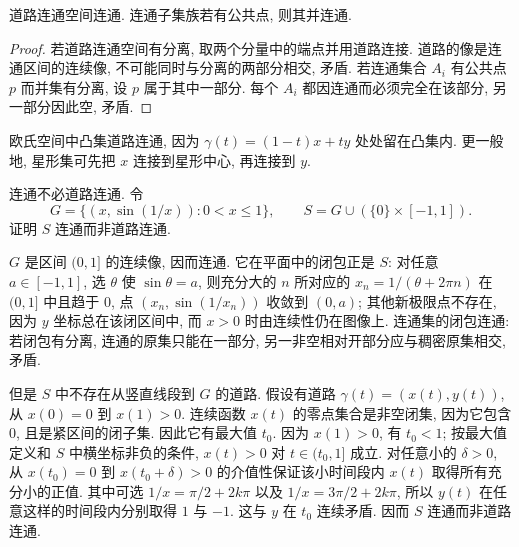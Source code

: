 \begin{proposition}
道路连通空间连通. 连通子集族若有公共点, 则其并连通.
\end{proposition}
\begin{proof}
若道路连通空间有分离, 取两个分量中的端点并用道路连接. 道路的像是连通区间的连续像, 不可能同时与分离的两部分相交, 矛盾. 若连通集合 $A_i$ 有公共点 $p$ 而并集有分离, 设 $p$ 属于其中一部分. 每个 $A_i$ 都因连通而必须完全在该部分, 另一部分因此空, 矛盾.
\end{proof}
欧氏空间中凸集道路连通, 因为 $\gamma(t)=(1-t)x+ty$ 处处留在凸集内. 更一般地, 星形集可先把 $x$ 连接到星形中心, 再连接到 $y$.

\begin{example}\label{ex:sine-curve}
连通不必道路连通. 令
\[
 G=\{(x,\sin(1/x)):0<x\le1\},\qquad S=G\cup(\{0\}\times[-1,1]).
\]
证明 $S$ 连通而非道路连通.
\end{example}
\begin{solution}
$G$ 是区间 $(0,1]$ 的连续像, 因而连通. 它在平面中的闭包正是 $S$: 对任意 $a\in[-1,1]$, 选 $\theta$ 使 $\sin\theta=a$, 则充分大的 $n$ 所对应的 $x_n=1/(\theta+2\pi n)$ 在 $(0,1]$ 中且趋于 $0$, 点 $(x_n,\sin(1/x_n))$ 收敛到 $(0,a)$; 其他新极限点不存在, 因为 $y$ 坐标总在该闭区间中, 而 $x>0$ 时由连续性仍在图像上. 连通集的闭包连通: 若闭包有分离, 连通的原集只能在一部分, 另一非空相对开部分应与稠密原集相交, 矛盾.

但是 $S$ 中不存在从竖直线段到 $G$ 的道路. 假设有道路 $\gamma(t)=(x(t),y(t))$, 从 $x(0)=0$ 到 $x(1)>0$. 连续函数 $x(t)$ 的零点集合是非空闭集, 因为它包含 $0$, 且是紧区间的闭子集. 因此它有最大值 $t_0$. 因为 $x(1)>0$, 有 $t_0<1$; 按最大值定义和 $S$ 中横坐标非负的条件, $x(t)>0$ 对 $t\in(t_0,1]$ 成立. 对任意小的 $\delta>0$, 从 $x(t_0)=0$ 到 $x(t_0+\delta)>0$ 的介值性保证该小时间段内 $x(t)$ 取得所有充分小的正值. 其中可选 $1/x=\pi/2+2k\pi$ 以及 $1/x=3\pi/2+2k\pi$, 所以 $y(t)$ 在任意这样的时间段内分别取得 $1$ 与 $-1$. 这与 $y$ 在 $t_0$ 连续矛盾. 因而 $S$ 连通而非道路连通.
\end{solution}

